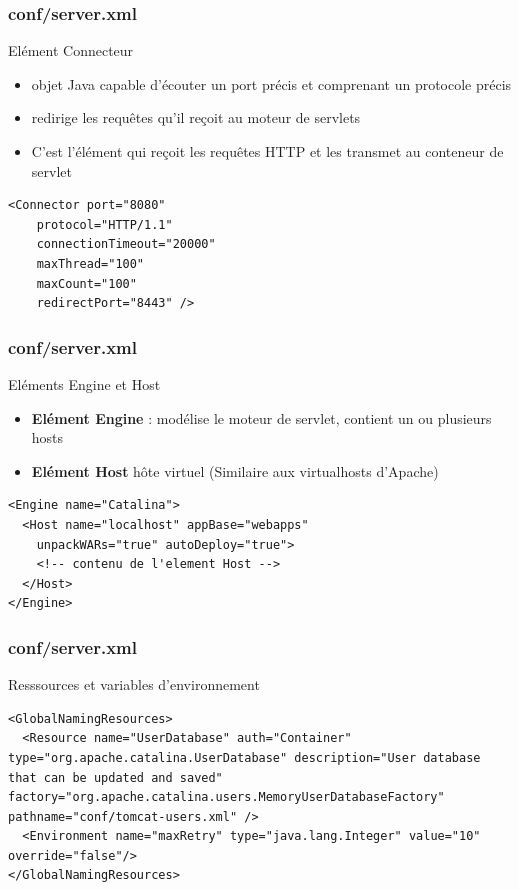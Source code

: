 \begin{frame}[fragile]
  \frametitle{conf/server.xml}
		Elément Connecteur
		\begin{itemize} 
   		\item objet Java capable d'écouter un port précis et comprenant un protocole précis
    	\item redirige les requêtes qu'il reçoit au moteur de servlets
      \item C'est l'élément qui reçoit les requêtes HTTP et les transmet au conteneur de servlet
		\end{itemize}

        \begin{lstlisting}
<Connector port="8080"
    protocol="HTTP/1.1"
    connectionTimeout="20000"
    maxThread="100"
    maxCount="100"
    redirectPort="8443" />
        \end{lstlisting}
\end{frame}

\begin{frame}[fragile]
    \frametitle{conf/server.xml}
		Eléments Engine et Host
		\begin{itemize}
   		\item \textbf{Elément Engine} : modélise le moteur de servlet, contient un ou plusieurs hosts
    	\item \textbf{Elément Host} hôte virtuel (Similaire aux virtualhosts d'Apache)
		\end{itemize}

        \begin{lstlisting}
<Engine name="Catalina">
  <Host name="localhost" appBase="webapps"
    unpackWARs="true" autoDeploy="true">
    <!-- contenu de l'element Host -->
  </Host>
</Engine>
        \end{lstlisting}
\end{frame}

\begin{frame}[fragile]
  \frametitle{conf/server.xml}
		Resssources et variables d'environnement

        \begin{lstlisting}
<GlobalNamingResources>
  <Resource name="UserDatabase" auth="Container" type="org.apache.catalina.UserDatabase" description="User database that can be updated and saved" factory="org.apache.catalina.users.MemoryUserDatabaseFactory" pathname="conf/tomcat-users.xml" />
  <Environment name="maxRetry" type="java.lang.Integer" value="10" override="false"/>
</GlobalNamingResources>

        \end{lstlisting}
\end{frame}

